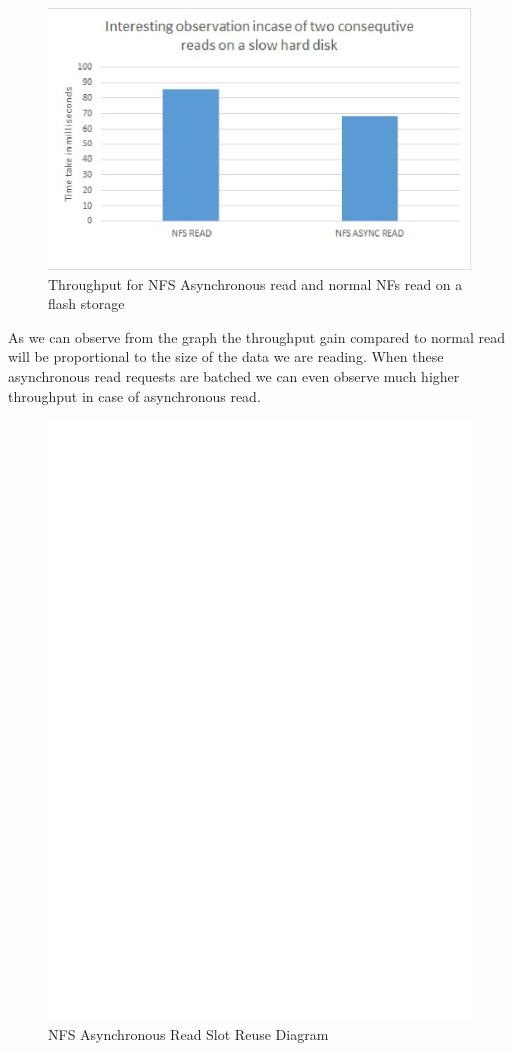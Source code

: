 \begin{figure}
\centering
\includegraphics[scale=1.0]{figures/InterstingObservation.eps}
\caption{Throughput for NFS Asynchronous read and normal NFs read on a flash storage}
\label{fig:InterstingObservation}
\end{figure}



	As we can observe from the graph the throughput gain compared to normal read will be proportional to the size of the data we are reading. When these asynchronous read requests are batched we can even observe much higher throughput in case of asynchronous read.  





\begin{figure}
\centering
\includegraphics[scale=0.7]{figures/Slotreuse.eps}
\caption{NFS Asynchronous Read Slot Reuse Diagram}
\label{fig:NFSSlotreuse}
\end{figure}

